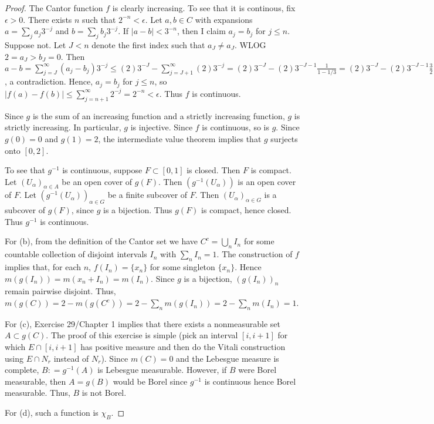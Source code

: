 \documentclass{article}
\begin{document}
\begin{proof}
The Cantor function $f$ is clearly increasing. To see that it is continous, fix $\epsilon > 0$.  There exists $n$ such that $2^{-n} < \epsilon$.  Let $a, b \in C$ with expansions $a = \sum_j a_j 3^{-j}$ and $b = \sum_j b_j 3^{-j}$.  If $|a - b| < 3^{-n}$, then I claim $a_j = b_j$ for $j \le n$. Suppose not. Let $J < n$ denote the first index such that $a_J \neq a_J$. WLOG $2 = a_J > b_J = 0$.  Then $a - b = \sum_{j = J}^\infty (a_j - b_j) 3^{-j} \le (2)3^{-J} - \sum_{j = J+1}^\infty (2) 3^{-j}  = (2)3^{-J} - (2)3^{-J - 1} \frac 1 {1 - 1/3} = (2)3^{-J} - (2)3^{-J - 1} \frac 3 2   =  3^{-J} \le 3^{-n}$, a contradiction.  Hence, $a_j = b_j$ for $j \le n$, so $|f(a) - f(b)| \le \sum_{j=n+1}^\infty 2^{-j} = 2^{-n} < \epsilon$.  Thus $f$ is continuous.

Since $g$ is the sum of an increasing function and a strictly increasing function, $g$ is strictly increasing.  In particular, $g$ is injective.  Since $f$ is continuous, so is $g$.  Since $g(0) = 0$ and $g(1) = 2$, the intermediate value theorem implies that $g$ surjects onto $[0, 2]$.  

To see that $g^{-1}$ is continuous, suppose $F \subset [0,1]$ is closed.  Then $F$ is compact.  Let $(U_\alpha)_{\alpha \in A}$ be an open cover of $g(F)$. Then $(g^{-1}(U_\alpha))$ is an open cover of $F$. Let $(g^{-1}(U_\alpha))_{\alpha \in G}$ be a finite subcover of $F$.  Then $(U_\alpha)_{\alpha \in G}$ is a subcover of $g(F)$, since $g$ is a bijection.  Thus $g(F)$ is compact, hence closed.  Thus $g^{-1}$ is continuous.

For (b), from the definition of the Cantor set we have $C^c = \bigcup_n I_n$ for some countable collection of disjoint intervals $I_n$ with $\sum_n I_n = 1$.  The construction of $f$ implies that, for each $n$,  $f(I_n) = \{x_n\}$ for some singleton $\{x_n\}$.  Hence $m(g(I_n)) = m(x_n + I_n) = m(I_n)$.  Since $g$ is a bijection, $(g(I_n))_n$ remain pairwise disjoint.  Thus, $m(g(C)) = 2 - m(g(C^c)) = 2 - \sum_n m(g(I_n)) = 2 - \sum_n m(I_n) = 1$.

For (c), Exercise 29/Chapter 1 implies that there exists a nonmeasurable set $A \subset g(C)$. The proof of this exercise is simple (pick an interval $[i, i+1]$ for which $E \cap [i,i+1]$ has positive measure and then do the Vitali construction using $E \cap N_r$ instead of $N_r$).  Since $m(C) = 0$ and the Lebesgue measure is complete, $B: = g^{-1}(A)$ is Lebesgue measurable.   However, if $B$ were Borel measurable, then $A = g(B)$ would be Borel since $g^{-1}$ is continuous hence Borel measurable.  Thus, $B$ is not Borel.

For (d), such a function is $\chi_B$.
\end{proof}
\end{document}
